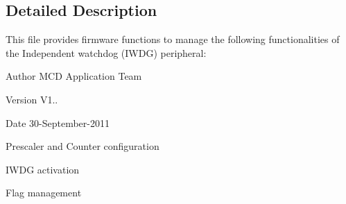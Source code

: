 \subsection{Detailed Description}
This file provides firmware functions to manage the following functionalities of the Independent watchdog (I\+W\+DG) peripheral\+: 

\begin{DoxyAuthor}{Author}
M\+CD Application Team 
\end{DoxyAuthor}
\begin{DoxyVersion}{Version}
V1.. 
\end{DoxyVersion}
\begin{DoxyDate}{Date}
30-\/\+September-\/2011
\begin{DoxyItemize}
\item Prescaler and Counter configuration
\item I\+W\+DG activation
\item Flag management
\end{DoxyItemize}
\end{DoxyDate}
